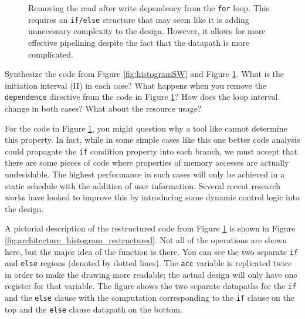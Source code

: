 \begin{figure}

\caption{ Removing the read after write dependency from the \lstinline{for} loop. This requires an \lstinline{if/else} structure that may seem like it is adding unnecessary complexity to the design. However, it allows for more effective pipelining despite the fact that the datapath is more complicated. }
\label{fig:histogramOpt1}
\end{figure}

\begin{exercise}
Synthesize the code from Figure \ref{fig:histogramSW} and Figure \ref{fig:histogramOpt1}. What is the initiation interval (II) in each case? What happens when you remove the \lstinline{dependence} directive from the code in Figure \ref{fig:histogramOpt1}? How does the loop interval change in both cases? What about the resource usage?
\end{exercise}

\begin{aside}
For the code in Figure \ref{fig:histogramOpt1}, you might question why a tool like \VHLS cannot determine this property.  In fact, while in some simple cases like this one better code analysis could propagate the \lstinline|if| condition property into each branch, we must accept that there are some pieces of code where properties of memory accesses are actually undecidable.  The highest performance in such cases will only be achieved in a static schedule with the addition of user information.  Several recent research works have looked to improve this by introducing some dynamic control logic into the design\cite{winterstein13dynamic, liu17elasticflow, dai17dynamic}.
\end{aside}

A pictorial description of the restructured code from Figure \ref{fig:histogramOpt1} is shown in Figure \ref{fig:architecture_histogram_restructured}. Not all of the operations are shown here, but the major idea of the function is there. You can see the two separate \lstinline{if} and \lstinline{else} regions (denoted by dotted lines). The \lstinline{acc} variable is replicated twice in order to make the drawing more readable; the actual design will only have one register for that variable.  The figure shows the two separate datapaths for the \lstinline{if} and the \lstinline{else} clause with the computation corresponding to the \lstinline{if} clause on the top and the \lstinline{else} clause datapath on the bottom. 

